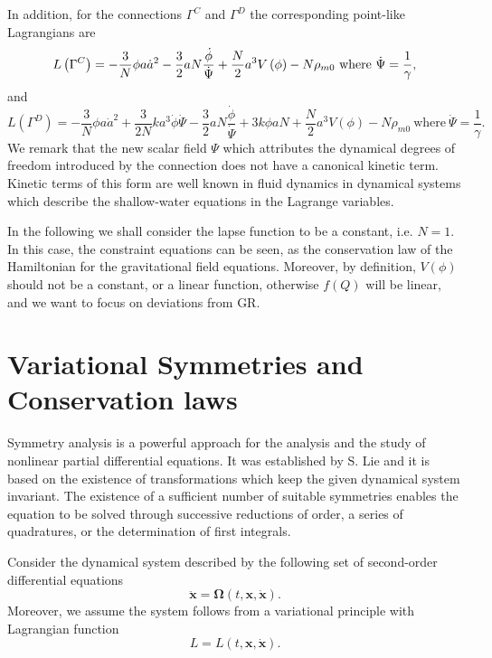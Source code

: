\documentclass[onecolumn,superscriptaddress,secnumarabic,nobibnotes,aps,prd,nofootinbib,altaffilletter,11pt]{revtex4}
\begin{document}
In addition, for the connections $\Gamma ^{C}$ and $\Gamma ^{D}$ the
corresponding point-like Lagrangians are %
\begin{equation}
L\left( \Gamma ^{C}\right) =-\frac{3}{N}\phi a\dot{a}^{2}-\frac{3}{2}aN\frac{%
\dot{\phi}}{\dot{\Psi}}+\frac{N}{2}a^{3}V\left( \phi \right) -N\rho _{m0}~%
\text{where}~\dot{\Psi}=\frac{1}{\gamma },  \label{lg3}
\end{equation}%
and 
\begin{equation}
L\left( \Gamma ^{D}\right) =-\frac{3}{N}\phi a\dot{a}^{2}+\frac{3}{2N}ka^{3}%
\dot{\phi}\dot{\Psi}-\frac{3}{2}aN\frac{\dot{\phi}}{\dot{\Psi}}+3k\phi aN+%
\frac{N}{2}a^{3}V\left( \phi \right) -N\rho _{m0}~\text{where}~\dot{\Psi}=%
\frac{1}{\gamma }.  \label{lg4}
\end{equation}%
We remark that the new scalar field $\Psi $ which attributes the dynamical
degrees of freedom introduced by the connection does not have a canonical
kinetic term. Kinetic terms of this form are well known in fluid dynamics in
dynamical systems which describe the shallow-water equations in the Lagrange
variables.

In the following we shall consider the lapse function to be a constant, i.e. 
$N=1$. In this case, the constraint equations can be seen, as the
conservation law of the Hamiltonian for the gravitational field equations.
Moreover, by definition, $V\left( \phi \right) $ should not be a constant,
or a linear function, otherwise $f\left( Q\right) $ will be linear, and we want to focus on deviations from GR.

\section{Variational Symmetries and Conservation laws}

\label{sec3}

Symmetry analysis is a powerful approach for the analysis and the study of
nonlinear partial differential equations. It was
established by S. Lie \cite{noe1} and it is based on the existence of
transformations which keep the given dynamical system invariant. The
existence of a sufficient number of suitable symmetries enables the equation
to be solved through successive reductions of order, a series of
quadratures, or the determination of first integrals.

Consider the dynamical system described by the following set of second-order
differential equations 
\begin{equation}
\mathbf{\ddot{x}}=\mathbf{\Omega }\left( t,\mathbf{x},\mathbf{\dot{x}}%
\right) .  \label{Lie.0}
\end{equation}%
Moreover, we assume the system follows from a variational principle with
Lagrangian function 
\begin{equation}
L=L\left( t,\mathbf{x},\mathbf{\dot{x}}\right) .  \label{Lie.1}
\end{equation}
\end{document}
